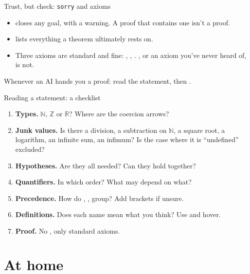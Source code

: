 \documentclass[10pt, aspectratio=169]{beamer}
\begin{document}
\begin{frame}[fragile]{Trust, but check: \texttt{sorry} and axioms}

\begin{itemize}
\item {} closes any goal, with a warning. A proof that contains one isn't a proof.
\item {} lists everything a theorem ultimately rests on.
\item Three axioms are standard and fine: , , . , or an axiom you've never heard of, is not.
\end{itemize}

\begin{keypoint}
\normalsize Whenever an AI hands you a proof: read the statement, then .
\end{keypoint}
\end{frame}

\begin{frame}[fragile]{Reading a statement: a checklist}
\begin{enumerate}
\item \textbf{Types.} $\mathbb{N}$, $\mathbb{Z}$ or $\mathbb{R}$? Where are the coercion arrows?
\item \textbf{Junk values.} Is there a division, a subtraction on $\mathbb{N}$, a square root, a logarithm, an infinite sum, an infimum? Is the case where it is ``undefined'' excluded?
\item \textbf{Hypotheses.} Are they all needed? Can they hold together?
\item \textbf{Quantifiers.} In which order? What may depend on what?
\item \textbf{Precedence.} How do , ,  group? Add brackets if unsure.
\item \textbf{Definitions.} Does each name mean what you think? Use  and hover.
\item \textbf{Proof.} No , only standard axioms.
\end{enumerate}
\end{frame}

\section{At home}
\end{document}
